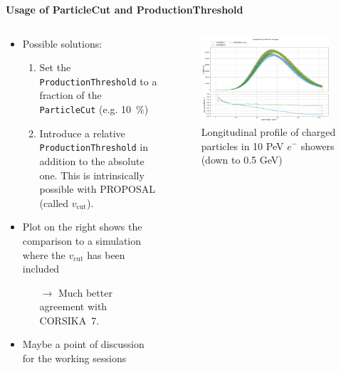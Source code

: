 \documentclass[aspectratio=1610, 9pt]{beamer}
\begin{document}
\begin{frame}

  \textbf{Usage of ParticleCut and ProductionThreshold}


    \begin{columns}[onlytextwidth]
        \begin{column}{0.45\textwidth}
            \begin{itemize}
              \item Possible solutions: 
              \begin{enumerate}
                \item Set the \texttt{ProductionThreshold} to a fraction of the \texttt{ParticleCut} (e.g. \SI{10}{\percent})
                \item Introduce a relative \texttt{ProductionThreshold} in addition to the absolute one. This is intrinsically possible with PROPOSAL (called $v_\text{cut}$).
              \end{enumerate}
              \item Plot on the right shows the comparison to a simulation where the $v_\text{cut}$ has been included
              \begin{itemize}
                \item[$\rightarrow$] Much better agreement with CORSIKA~7.
              \end{itemize}
              \item Maybe a point of discussion for the working sessions
            \end{itemize}
        \end{column}
        \begin{column}{0.55\textwidth}
            \begin{figure}
                \centering
                \includegraphics[width=0.95\textwidth]{plots/long_charged_vcut.png}
                \caption{Longitudinal profile of charged particles in 10 PeV $e^-$ showers (down to 0.5 GeV)}
            \end{figure}
        \end{column}
    \end{columns}
\end{frame}
\end{document}
